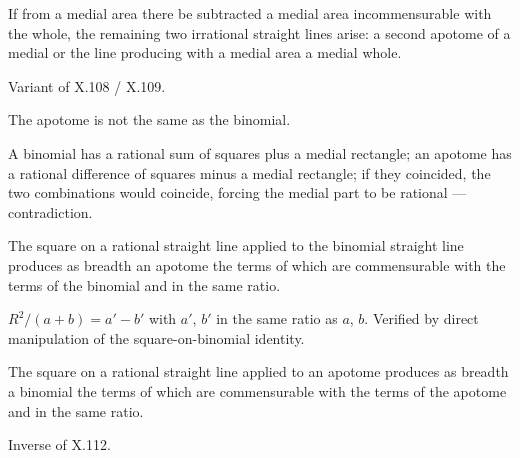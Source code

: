 \begin{claim}
\label{prop:X.110}
If from a medial area there be subtracted a medial area
incommensurable with the whole, the remaining two irrational straight
lines arise: a second apotome of a medial or the line producing with
a medial area a medial whole.
\end{claim}
\begin{evidence}[Proof of X.110]
\label{ev:X.110}
Variant of X.108 / X.109.
\end{evidence}

\begin{claim}
\label{prop:X.111}
The apotome is not the same as the binomial.
\end{claim}
\begin{evidence}[Proof of X.111]
\label{ev:X.111}
A binomial has a rational sum of squares plus a medial rectangle; an
apotome has a rational difference of squares minus a medial
rectangle; if they coincided, the two combinations would coincide,
forcing the medial part to be rational --- contradiction.
\end{evidence}

\begin{claim}
\label{prop:X.112}
The square on a rational straight line applied to the binomial
straight line produces as breadth an apotome the terms of which are
commensurable with the terms of the binomial and in the same ratio.
\end{claim}
\begin{evidence}[Proof of X.112]
\label{ev:X.112}
$R^2 / (a + b) = a' - b'$ with $a'$, $b'$ in the same ratio as $a$,
$b$.  Verified by direct manipulation of the square-on-binomial
identity.
\end{evidence}

\begin{claim}
\label{prop:X.113}
The square on a rational straight line applied to an apotome produces
as breadth a binomial the terms of which are commensurable with the
terms of the apotome and in the same ratio.
\end{claim}
\begin{evidence}[Proof of X.113]
\label{ev:X.113}
Inverse of X.112.
\end{evidence}

